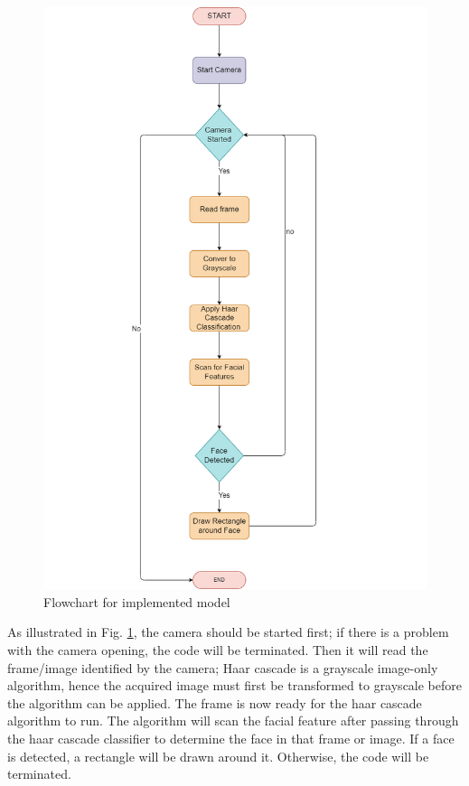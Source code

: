 \documentclass[journal]{IEEEtran}
\begin{document}
\begin{figure}[!ht]
	\centering
	\includegraphics[width=\linewidth]{./img/HaarFlowchart.dio.png}
	\caption{Flowchart for implemented model}
	\label{haar_flowchart}
\end{figure}

As illustrated in Fig. \ref{haar_flowchart}, the camera should
be started first; if there is a problem with the camera opening,
the code will be terminated. Then it will read the frame/image
identified by the camera; Haar cascade is a grayscale
image-only algorithm, hence the acquired image must first be
transformed to grayscale before the algorithm can be applied.
The frame is now ready for the haar cascade algorithm to run.
The algorithm will scan the facial feature after passing
through the haar cascade classifier to determine the face in
that frame or image. If a face is detected, a rectangle will
be drawn around it. Otherwise, the code will be terminated.






\end{document}
